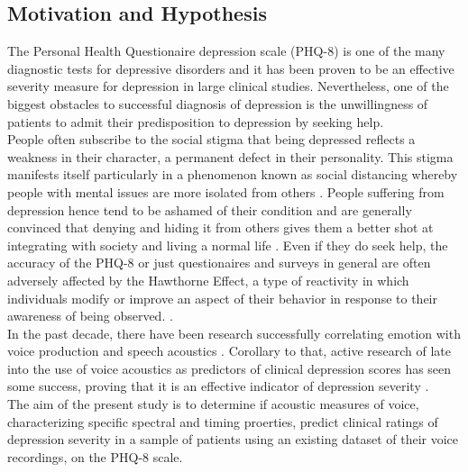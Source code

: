 \documentclass{article}
\begin{document}
	\subsection{Motivation and Hypothesis}
	The Personal Health Questionaire depression scale (PHQ-8) is one of the many diagnostic tests for depressive disorders and it has been proven to be an effective severity measure for depression in large clinical studies\cite{jad2008}. Nevertheless, one of the biggest obstacles to successful diagnosis of depression is the unwillingness of patients to admit their predisposition to depression by seeking help.\\

	People often subscribe to the social stigma that being depressed reflects a weakness in their character, a permanent defect in their personality. This stigma manifests itself particularly in a phenomenon known as social distancing whereby people with mental issues are more isolated from others \cite{tpcrp2011}.  People suffering from depression hence tend to be ashamed of their condition and are generally convinced that denying and hiding it from others gives them a better shot at integrating with society and living a normal life \cite{bmb2001}. Even if they do seek help, the accuracy of the PHQ-8 or just questionaires and surveys in general are often adversely affected by the Hawthorne Effect, a type of reactivity in which individuals modify or improve an aspect of their behavior in response to their awareness of being observed. \cite{jce2014}.\\

	In the past decade, there have been research successfully correlating emotion with voice production and speech acoustics \cite{uwa2001}. Corollary to that, active research of late into the use of voice acoustics as predictors of clinical depression scores has seen some success, proving that it is an effective indicator of depression severity \cite{jov2016}.\\

	The aim of the present study is to determine if acoustic measures of voice, characterizing specific spectral and timing proerties, predict clinical ratings of depression severity in a sample of patients using an existing dataset of their voice recordings, on the PHQ-8 scale.\\
	
\end{document}
